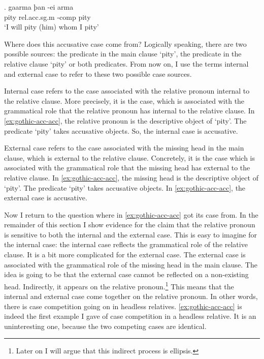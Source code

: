 \exg. gaarma þan -ei arma\\
 pity\scsub{[acc]} \ac{rel}.\ac{acc}.\ac{sg}.\ac{m} -\ac{comp} pity\scsub{[acc]}\\
 `I will pity (him) whom I pity' \label{ex:gothic-acc-acc}

Where does this accusative case come from? Logically speaking, there are two possible sources: the predicate in the main clause  `pity', the predicate in the relative clause  `pity' or both predicates. From now on, I use the terms internal and external case to refer to these two possible case sources.

Internal case refers to the case associated with the relative pronoun internal to the relative clause. More precisely, it is the case, which is associated with the grammatical role that the relative pronoun has internal to the relative clause. In \ref{ex:gothic-acc-acc}, the relative pronoun is the descriptive object of  `pity'. The predicate  `pity' takes accusative objects. So, the internal case is accusative.

External case refers to the case associated with the missing head in the main clause, which is external to the relative clause. Concretely, it is the case which is associated with the grammatical role that the missing head has external to the relative clause. In \ref{ex:gothic-acc-acc}, the missing head is the descriptive object of  `pity'. The predicate  `pity' takes accusative objects. In \ref{ex:gothic-acc-acc}, the external case is accusative.

Now I return to the question where  in \ref{ex:gothic-acc-acc} got its case from. In the remainder of this section I show evidence for the claim that the relative pronoun is sensitive to both the internal and the external case.
This is easy to imagine for the internal case: the internal case reflects the grammatical role of the relative clause. It is a bit more complicated for the external case. The external case is associated with the grammatical role of the missing head in the main clause. The idea is going to be that the external case cannot be reflected on a non-existing head. Indirectly, it appears on the relative pronoun.\footnote{
Later on I will argue that this indirect process is ellipsis.
}
This means that the internal and external case come together on the relative pronoun. In other words, there is case competition going on in headless relatives. \ref{ex:gothic-acc-acc} is indeed the first example I gave of case competition in a headless relative. It is an uninteresting one, because the two competing cases are identical.

